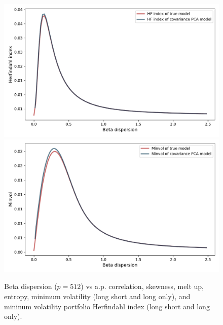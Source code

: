 \documentclass[leqno,12pt]{article}
\begin{document}
{\begin{figure}[htp]
\begin{center}
  \includegraphics[scale=0.33]{img/DispersionvsLSMinvolHFindex1factorsN512T256fvol16minsvol30maxsvol90}
  \includegraphics[scale=0.33]{img/DispersionvsLOMinvolHFindex1factorsN512T256fvol16minsvol30maxsvol90}
\end{center}
\caption{Beta dispersion
($p = 512$) vs a.p. correlation, skewness, melt up, entropy,
minimum volatility (long short and long only),
and mininum volatility portfolio Herfindahl index
(long short and long only).} 
\end{figure}





}
\end{document}
